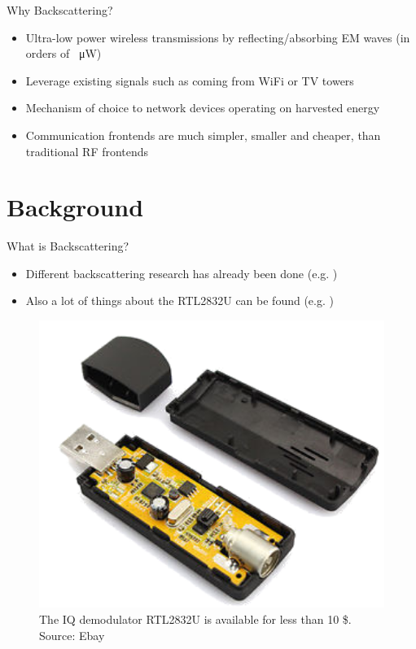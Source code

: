 \documentclass[apectratio=169]{beamer}
\begin{document}
\begin{frame}{Why Backscattering?}
	\begin{itemize}
		\item<1-> Ultra-low power wireless transmissions by reflecting/absorbing EM waves (in orders of \SI{}{\micro\watt}) \cite{liu_ambient_2013}
		\item<2-> Leverage existing signals such as coming from WiFi \cite{hitchhike,kellogg2015wi} or TV towers \cite{liu_ambient_2013,parks_turbocharging_2014}
		\item<3-> Mechanism of choice to network devices operating on harvested energy
		\item<4-> Communication frontends are much simpler, smaller and cheaper, than traditional RF frontends
	\end{itemize}
\end{frame}

\section{Background}
\begin{frame}{What is Backscattering?}
	\begin{minipage}{0.47\textwidth}
	\begin{itemize}
		\item Different backscattering research has already been done (e.g. \cite{Vincent})
		\item Also a lot of things about the RTL2832U can be found (e.g. \cite{Ana}) 
	\end{itemize}
	\end{minipage}
	\hfill
	\begin{minipage}{0.47\textwidth}
	\begin{figure}[H]	
		\centering
		\includegraphics[width=1\textwidth]{./fig/rtlsdr}
		\caption{The IQ demodulator RTL2832U is available for less than 10 \$. Source: Ebay}
	\end{figure}
	\end{minipage}
\end{frame}
	
\end{document}
